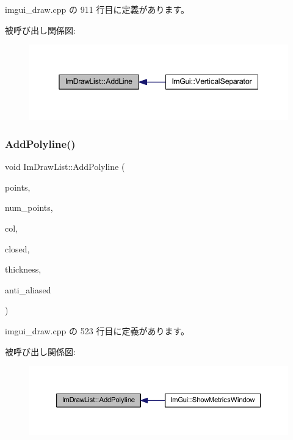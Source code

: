  imgui\+\_\+draw.\+cpp の 911 行目に定義があります。

被呼び出し関係図\+:\nopagebreak
\begin{figure}[H]
\begin{center}
\leavevmode
\includegraphics[width=345pt]{struct_im_draw_list_a6db76ca2506dc86ad4d602fdcd2e2ea8_icgraph}
\end{center}
\end{figure}
\mbox{\label{struct_im_draw_list_a3ca939b6e4b35a93611d2d42d7e20434}} 
\subsubsection{\texorpdfstring{Add\+Polyline()}{AddPolyline()}}
{\footnotesize\ttfamily void Im\+Draw\+List\+::\+Add\+Polyline (\begin{DoxyParamCaption}\item[{const \mbox{\hyperlink{struct_im_vec2}{Im\+Vec2}} $\ast$}]{points,  }\item[{const int}]{num\+\_\+points,  }\item[{\mbox{\hyperlink{imgui_8h_a118cff4eeb8d00e7d07ce3d6460eed36}{Im\+U32}}}]{col,  }\item[{bool}]{closed,  }\item[{float}]{thickness,  }\item[{bool}]{anti\+\_\+aliased }\end{DoxyParamCaption})}



 imgui\+\_\+draw.\+cpp の 523 行目に定義があります。

被呼び出し関係図\+:\nopagebreak
\begin{figure}[H]
\begin{center}
\leavevmode
\includegraphics[width=350pt]{struct_im_draw_list_a3ca939b6e4b35a93611d2d42d7e20434_icgraph}
\end{center}
\end{figure}
\mbox{\label{struct_im_draw_list_ac3fd62862000b2a7a4e7f61da0a4e3fd}} 
